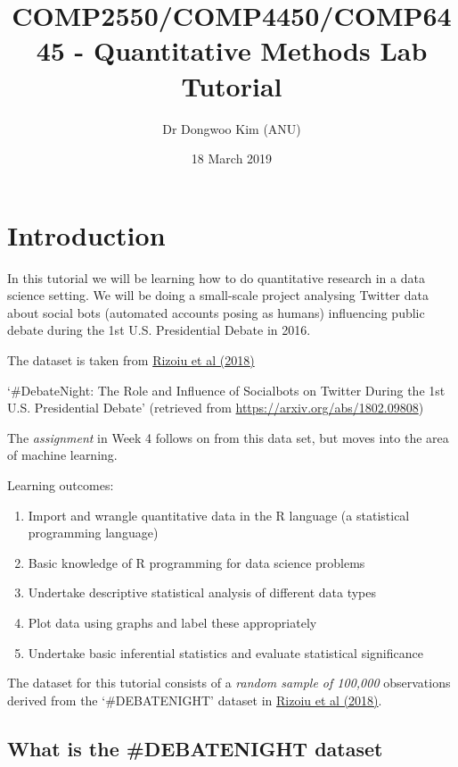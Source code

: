 \documentclass[]{article}
\title{COMP2550/COMP4450/COMP6445 - Quantitative Methods Lab Tutorial}
\author{Dr Dongwoo Kim (ANU)}
\date{18 March 2019}
\providecommand{\tightlist}{%
  \setlength{\itemsep}{0pt}\setlength{\parskip}{0pt}}
\begin{document}
\maketitle

\hypertarget{introduction}{%
\section{Introduction}\label{introduction}}

In this tutorial we will be learning how to do quantitative research in
a data science setting. We will be doing a small-scale project analysing
Twitter data about social bots (automated accounts posing as humans)
influencing public debate during the 1st U.S. Presidential Debate in
2016.

The dataset is taken from \href{https://arxiv.org/abs/1802.09808}{Rizoiu
et al (2018)}

`\#DebateNight: The Role and Influence of Socialbots on Twitter During
the 1st U.S. Presidential Debate' (retrieved from
\url{https://arxiv.org/abs/1802.09808})

The \emph{assignment} in Week 4 follows on from this data set, but moves
into the area of machine learning.

Learning outcomes:

\begin{enumerate}
\def\labelenumi{\arabic{enumi}.}
\tightlist
\item
  Import and wrangle quantitative data in the R language (a statistical
  programming language)
\item
  Basic knowledge of R programming for data science problems
\item
  Undertake descriptive statistical analysis of different data types
\item
  Plot data using graphs and label these appropriately
\item
  Undertake basic inferential statistics and evaluate statistical
  significance
\end{enumerate}

The dataset for this tutorial consists of a \emph{random sample of
100,000} observations derived from the `\#DEBATENIGHT' dataset in
\href{https://arxiv.org/abs/1802.09808}{Rizoiu et al (2018)}.

\hypertarget{what-is-the-debatenight-dataset}{%
\subsection{What is the \#DEBATENIGHT
dataset}\label{what-is-the-debatenight-dataset}}
\end{document}
